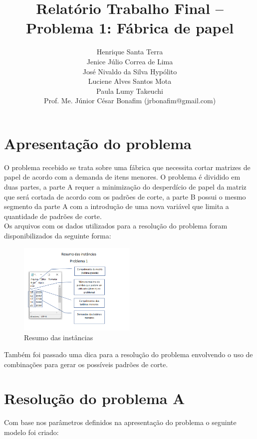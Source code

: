 \documentclass[12pt]{article}
\title{Relatório Trabalho Final – Problema 1: Fábrica de papel}
\author{
    Henrique Santa Terra \\
    Jenice Júlio Correa de Lima \\
    José Nivaldo da Silva Hypólito \\
    Luciene Alves Santos Mota \\
    Paula Lumy Takeuchi \\
    Prof.  Me.  Júnior César Bonafim (jrbonafim@gmail.com) 
}
\begin{document}
\maketitle

\newpage
\section{Apresentação do problema} %
O problema recebido se trata sobre uma fábrica que necessita cortar matrizes de 
papel de acordo com a demanda de itens menores. O problema é dividido em duas partes, 
a parte A requer a minimização do desperdício de papel da matriz que será cortada 
de acordo com os padrões de corte, a parte B possui o mesmo segmento da parte A 
com a introdução de uma nova variável que limita a quantidade de padrões de corte.\\

Os arquivos com os dados utilizados para a resolução do problema foram disponibilizados da seguinte forma:\\

\begin{figure}[h]
    \centering
    \includegraphics[width=0.5\textwidth]{input.png}
    \caption{Resumo das instâncias}
\end{figure}

Também foi passado uma dica para a resolução do problema envolvendo o uso de combinações 
para gerar os possíveis padrões de corte.\\

\newpage

\section{Resolução do problema A} %
Com base nos parâmetros definidos na apresentação do problema o seguinte modelo foi criado:
\end{document}
